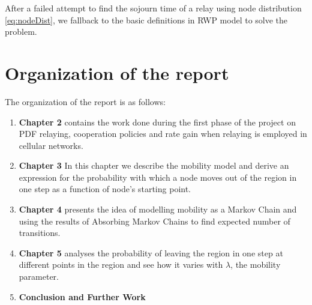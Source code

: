 	After a failed attempt to find the sojourn time of a relay using node distribution \ref{eq:nodeDist}, we fallback to the basic definitions in RWP model to solve the problem.   


\section*{Organization of the report}
The organization of the report is as follows:
\begin{enumerate}

	\item \textbf{Chapter 2} contains the work done during the first phase of the project on PDF relaying, cooperation policies and rate gain when relaying is employed in cellular networks.  

	\item \textbf{Chapter 3} In this chapter we describe the mobility model and derive an expression for the probability with which a node\footnotemark\mbox{} moves out of the region in one step as a function of node's starting point.  
	\item \textbf{Chapter 4} presents the idea of modelling mobility as a Markov Chain and using the results of Absorbing Markov Chains to find expected number of transitions.

	\item \textbf{Chapter 5} analyses the probability of leaving the region in one step at different points in the region and see how it varies with $\lambda$, the mobility parameter. 

	\item \textbf{Conclusion and Further Work}

\end{enumerate}


